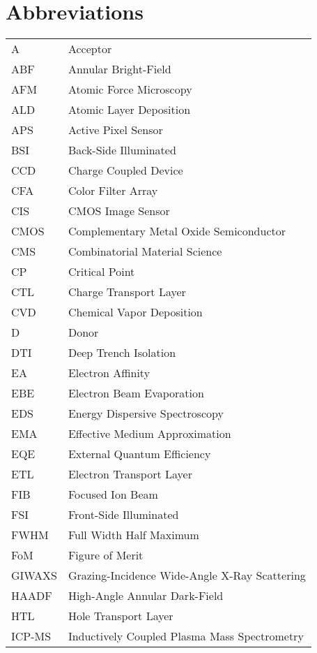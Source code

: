 \chapter{Abbreviations}                           \label{ch:abbreviations}

\begin{longtable}{l p{}}
\endfirsthead
\endhead
A & Acceptor \\
ABF  & Annular Bright-Field \\
AFM & Atomic Force Microscopy \\
ALD & Atomic Layer Deposition \\
APS & Active Pixel Sensor \\
BSI & Back-Side Illuminated \\
CCD & Charge Coupled Device \\
CFA & Color Filter Array \\
CIS & CMOS Image Sensor \\
CMOS  & Complementary Metal Oxide Semiconductor \\
CMS & Combinatorial Material Science  \\
CP & Critical Point \\
CTL & Charge Transport Layer \\
CVD & Chemical Vapor Deposition \\
D & Donor \\
DTI & Deep Trench Isolation \\
EA & Electron Affinity \\
EBE & Electron Beam Evaporation \\
EDS & Energy Dispersive Spectroscopy \\
EMA & Effective Medium Approximation \\
EQE & External Quantum Efficiency \\
ETL  & Electron Transport Layer \\
FIB & Focused Ion Beam \\
FSI & Front-Side Illuminated  \\
FWHM & Full Width Half Maximum \\
FoM & Figure of Merit \\
GIWAXS & Grazing-Incidence Wide-Angle X-Ray Scattering \\
HAADF & High-Angle Annular Dark-Field \\
HTL & Hole Transport Layer \\
ICP-MS  & Inductively Coupled Plasma Mass Spectrometry \\

\end{longtable}
